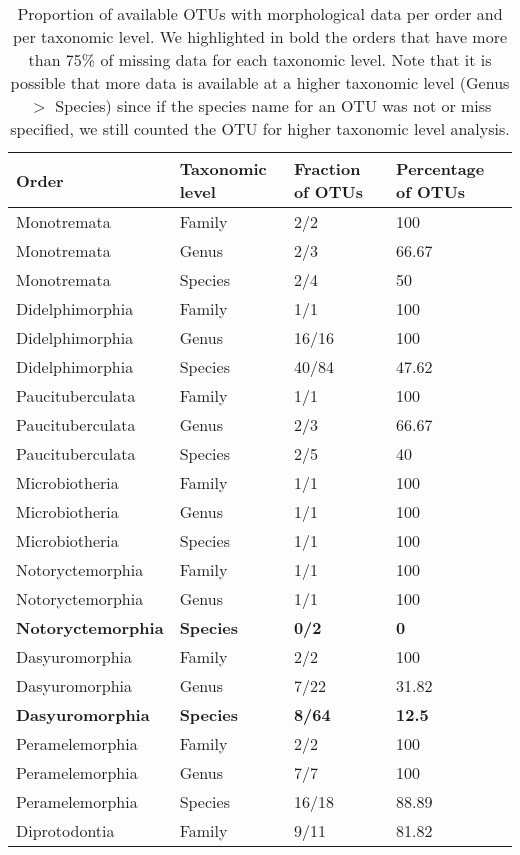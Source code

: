 \begin{longtable}{llll}
\caption{Proportion of available OTUs with morphological data per order and per taxonomic level. We highlighted in bold the orders that have more than 75\% of missing data for each taxonomic level. Note that it is possible that more data is available at a higher taxonomic level (Genus $>$ Species) since if the species name for an OTU was not or miss specified, we still counted the OTU for higher taxonomic level analysis.} \\ 
  \hline
Order & Taxonomic level & Fraction of OTUs & Percentage of OTUs \\ 
  \hline
Monotremata & Family & 2/2 & 100 \\ 
  Monotremata & Genus & 2/3 & 66.67 \\ 
  Monotremata & Species & 2/4 & 50 \\ 
  Didelphimorphia & Family & 1/1 & 100 \\ 
  Didelphimorphia & Genus & 16/16 & 100 \\ 
  Didelphimorphia & Species & 40/84 & 47.62 \\ 
  Paucituberculata & Family & 1/1 & 100 \\ 
  Paucituberculata & Genus & 2/3 & 66.67 \\ 
  Paucituberculata & Species & 2/5 & 40 \\ 
  Microbiotheria & Family & 1/1 & 100 \\ 
  Microbiotheria & Genus & 1/1 & 100 \\ 
  Microbiotheria & Species & 1/1 & 100 \\ 
  Notoryctemorphia & Family & 1/1 & 100 \\ 
  Notoryctemorphia & Genus & 1/1 & 100 \\ 
  \textbf{Notoryctemorphia} & \textbf{Species} & \textbf{0/2} & \textbf{0} \\ 
  Dasyuromorphia & Family & 2/2 & 100 \\ 
  Dasyuromorphia & Genus & 7/22 & 31.82 \\ 
  \textbf{Dasyuromorphia} & \textbf{Species} & \textbf{8/64} & \textbf{12.5} \\ 
  Peramelemorphia & Family & 2/2 & 100 \\ 
  Peramelemorphia & Genus & 7/7 & 100 \\ 
  Peramelemorphia & Species & 16/18 & 88.89 \\ 
  Diprotodontia & Family & 9/11 & 81.82 \\ 

\end{longtable}

